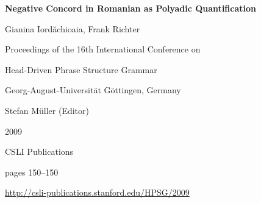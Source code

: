 \documentclass[a4paper,11pt]{article}
\begin{document}
\begin{center}
  {\huge\bf Negative Concord in Romanian as Polyadic Quantification\par}

  \bigskip

  {\LARGE Gianina Iordăchioaia, Frank Richter\par}

  \vspace*{3\bigskipamount}

  Proceedings of the 16th International Conference on\par Head-Driven Phrase Structure Grammar

  \bigskip

  Georg-August-Universit\"{a}t G\"{o}ttingen, Germany

  \medskip

  Stefan Müller (Editor)

  \medskip

  2009

  \medskip

  CSLI Publications

  \medskip

  pages 150--150

  \medskip

  \url{http://csli-publications.stanford.edu/HPSG/2009}
\end{center}

\newpage

        
\end{document}
